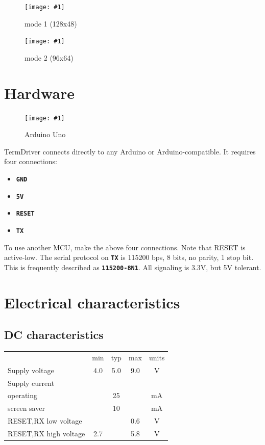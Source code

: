 \documentclass{article}
\newcommand{\heavyline}{\specialrule{1pt}{1pt}{1pt}}
\newcommand{\png}[2]{
\begin{figure}[H]
\begin{center}
\texttt{[image: \#1]}
\caption{#2}
\end{center}
\end{figure}
}
\newcommand{\mach}[1]{\texttt{\textbf{#1}}}
\begin{document}
\png{img/moby1}{mode 1 (128x48)}
\png{img/moby2}{mode 2 (96x64)}

\newpage
\section{Hardware}

\png{img/arduino}{Arduino Uno}

TermDriver connects directly to any Arduino or Arduino-compatible.
It requires four connections:

\begin{itemize}
\item \mach{GND}
\item \mach{5V}
\item \mach{RESET}
\item \mach{TX}
\end{itemize}

\noindent
To use another MCU, make the above four connections. Note that RESET is active-low.
The serial protocol on \mach{TX} is 115200 bps, 8 bits, no parity, 1 stop bit.
This is frequently described as \mach{115200-8N1}.
All signaling is 3.3V, but 5V tolerant.

\newpage
\hypertarget{technical-specifications}{}
\hypertarget{technical-specifications}{%
\section{Electrical characteristics}\label{electrical-characteristics}}

\subsection{DC characteristics}
\vspace{10 pt}
{\renewcommand{\arraystretch}{1.2}%

\begin{tabularx}{\linewidth}{Xcccc}
\heavyline
& min & typ & max & units \\ \heavyline

Supply voltage & 4.0 & 5.0 & 9.0 & V \\ \hline

Supply current & & & & \\
\hspace{10pt} operating & & 25 & & mA \\
\hspace{10pt} screen saver & & 10 & & mA \\ \hline

RESET,RX low voltage & & & 0.6 & V \\ \hline
RESET,RX high voltage & 2.7 &   & 5.8 & V \\ \hline
\end{tabularx}}
\vspace{10 pt}
\end{document}
